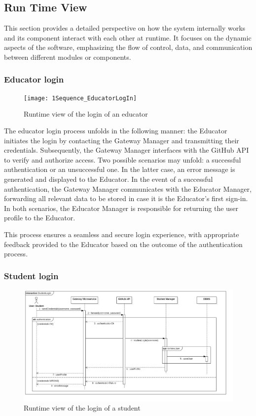 \subsection{Run Time View}

This section provides a detailed perspective on how the system internally works and its component interact with each other at runtime. It focuses on the dynamic aspects of the software, emphasizing the flow of control, data, and communication between different modules or components.


\subsubsection*{Educator login}
\begin{figure}[h!]
    \centering
    \texttt{[image: 1Sequence\_EducatorLogIn]}
    \caption{Runtime view of the login of an educator}
    \label{fig:educator_login}
\end{figure}

The educator login process unfolds in the following manner: the Educator initiates the login by contacting the Gateway Manager and transmitting their credentials. Subsequently, the Gateway Manager interfaces with the GitHub API to verify and authorize access. Two possible scenarios may unfold: a successful authentication or an unsuccessful one. In the latter case, an error message is generated and displayed to the Educator. In the event of a successful authentication, the Gateway Manager communicates with the Educator Manager, forwarding all relevant data to be stored in case it is the Educator's first sign-in. In both scenarios, the Educator Manager is responsible for returning the user profile to the Educator.

This process ensures a seamless and secure login experience, with appropriate feedback provided to the Educator based on the outcome of the authentication process.
\newpage

\subsubsection*{Student login}
\begin{figure}[h!]
    \centering
    \includegraphics[width=1\linewidth]{2.ArchitecturalDesign/res/StudentLogin.jpg}
    \caption{Runtime view of the login of a student}
    \label{fig:student_login}
\end{figure}

